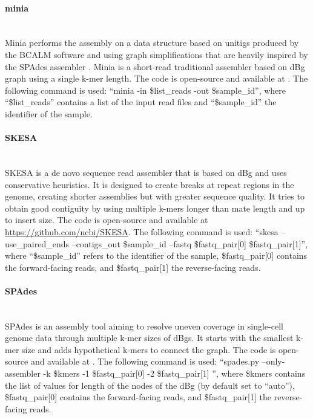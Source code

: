 \paragraph{minia} \mbox{}\\

Minia \cite{chikhi_space-efficient_2013} performs the assembly on a data structure based on unitigs produced by the BCALM \cite{chikhi_compacting_2016} software and using graph simplifications that are heavily inspired by the SPAdes assembler \cite{bankevich_spades_2012}. Minia is a short-read traditional assembler based on dBg graph using a single k-mer length. The code is open-source and available at  \cite{noauthor_minia_2022}. The following command is used: “minia -in \$list\_reads -out \$sample\_id”,  where “\$list\_reads” contains a list of the input read files and “\$sample\_id” the identifier of the sample.

\paragraph{SKESA} \mbox{}\\

SKESA \cite{souvorov_skesa_2018} is a de novo sequence read assembler that is based on dBg and uses conservative heuristics. It is designed to create breaks at repeat regions in the genome, creating shorter assemblies but with greater sequence quality. It tries to obtain good contiguity by using multiple k-mers longer than mate length and up to insert size. The code is open-source and available at \url{https://github.com/ncbi/SKESA}. The following command is used: “skesa --use\_paired\_ends --contigs\_out \$sample\_id --fastq \$fastq\_pair[0] \$fastq\_pair[1]”, where “\$sample\_id” refers to the identifier of the sample, \$fastq\_pair[0] contains the forward-facing reads, and \$fastq\_pair[1] the reverse-facing reads.

\paragraph{SPAdes} \mbox{}\\

SPAdes \cite{bankevich_spades_2012} is an assembly tool aiming to resolve uneven coverage in single-cell genome data through multiple k-mer sizes of dBgs. It starts with the smallest k-mer size and adds hypothetical k-mers to connect the graph. The code is open-source and available at \cite{noauthor_spades_nodate}. The following command is used:  “spades.py --only-assembler -k \$kmers -1 \$fastq\_pair[0] -2 \$fastq\_pair[1] ”, where \$kmers contains the list of values for length of the nodes of the dBg (by default set to “auto”), \$fastq\_pair[0] contains the forward-facing reads, and \$fastq\_pair[1] the reverse-facing reads.

